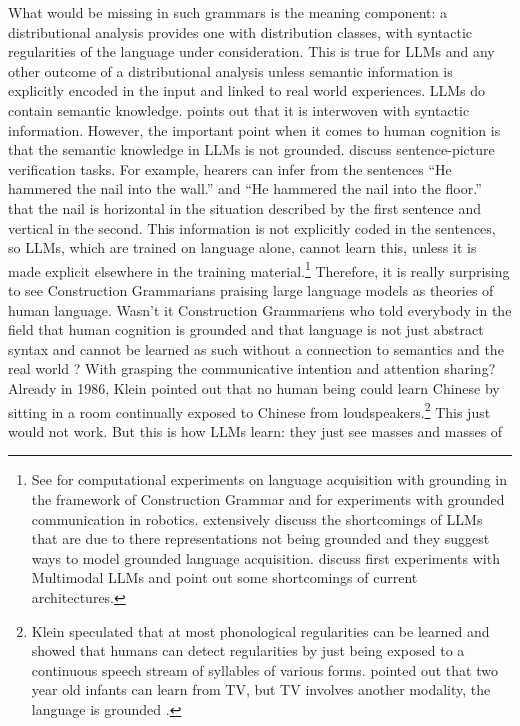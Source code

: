 What would be missing in such grammars is the meaning component: a distributional analysis provides
one with distribution classes, with syntactic regularities of the language under consideration. This
is true for LLMs and any other outcome of a distributional analysis unless semantic information is
explicitly encoded in the input and linked to real world experiences.
  LLMs do contain semantic knowledge. \citet[358]{Piantadosi2024a} points out that it is
  interwoven with syntactic information. However, the important point when it comes to human cognition is
  that the semantic knowledge in LLMs is not grounded. \citet[2]{JonesBergenTrott2024a} discuss
  sentence-picture verification tasks. For example, hearers can infer from the sentences ``He
  hammered the nail into the wall.'' and ``He hammered the nail into the floor.'' that the nail is
  horizontal in the situation described by the first sentence and vertical in the second. This
  information is not explicitly coded in the sentences, so LLMs, which are trained on language
  alone, cannot learn this, unless it is made explicit elsewhere in the training material.\footnote{%
See \citet{CM2001a} for computational experiments on language
  acquisition with grounding in the framework of Construction Grammar and \citet{Steels2003a} for
  experiments with grounded communication in robotics. \citet{BeulsVanEcke2024a} extensively
  discuss the shortcomings of LLMs that are due to there representations not being grounded and they
  suggest ways to model grounded language acquisition. \citet{JonesBergenTrott2024a} discuss first
  experiments with Multimodal LLMs and point out some shortcomings of current architectures.%
}
Therefore, it is really surprising to see Construction Grammarians
praising large language models as theories of human language. Wasn't it Construction Grammariens who
told everybody in the field that human cognition is grounded
\citep{Barsalou2008a} and that language is not just abstract
syntax and cannot be learned as such without a connection to semantics and the real world
\parencites[44]{Klein86a-u}[113]{Tomasello2003a}[Section~4.2.3, 4.2.8]{AL2011a-u}? With grasping the communicative
intention and attention sharing? Already in 1986, Klein pointed out that no human being could learn
Chinese by sitting in a room continually exposed to Chinese from loudspeakers.\footnote{%
Klein speculated that at most phonological regularities can be learned and \citet{NHSA2004a} showed
that humans can detect regularities by just being exposed to a continuous speech stream
of syllables of various forms. \citet[44]{Sogaard2023a} pointed out that two year old infants can learn
from TV, but TV involves another modality, the language is grounded \citep{Rice1983a}.
} This just would not work. But this is how LLMs learn: they just see masses and masses of
